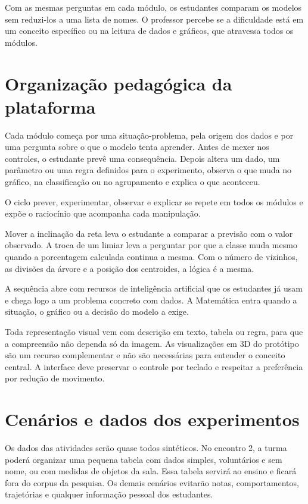 Com as mesmas perguntas em cada módulo, os estudantes comparam os modelos sem reduzi-los a uma lista de nomes. O professor percebe se a dificuldade está em um conceito específico ou na leitura de dados e gráficos, que atravessa todos os módulos.

\section{Organização pedagógica da plataforma}

Cada módulo começa por uma situação-problema, pela origem dos dados e por uma pergunta sobre o que o modelo tenta aprender. Antes de mexer nos controles, o estudante prevê uma consequência. Depois altera um dado, um parâmetro ou uma regra definidos para o experimento, observa o que muda no gráfico, na classificação ou no agrupamento e explica o que aconteceu.

O ciclo prever, experimentar, observar e explicar se repete em todos os módulos e expõe o raciocínio que acompanha cada manipulação.

Mover a inclinação da reta leva o estudante a comparar a previsão com o valor observado. A troca de um limiar leva a perguntar por que a classe muda mesmo quando a porcentagem calculada continua a mesma. Com o número de vizinhos, as divisões da árvore e a posição dos centroides, a lógica é a mesma.

A sequência abre com recursos de inteligência artificial que os estudantes já usam e chega logo a um problema concreto com dados. A Matemática entra quando a situação, o gráfico ou a decisão do modelo a exige.

Toda representação visual vem com descrição em texto, tabela ou regra, para que a compreensão não dependa só da imagem. As visualizações em 3D do protótipo são um recurso complementar e não são necessárias para entender o conceito central. A interface deve preservar o controle por teclado e respeitar a preferência por redução de movimento.

\section{Cenários e dados dos experimentos}

Os dados das atividades serão quase todos sintéticos. No encontro 2, a turma poderá organizar uma pequena tabela com dados simples, voluntários e sem nome, ou com medidas de objetos da sala. Essa tabela servirá ao ensino e ficará fora do corpus da pesquisa. Os demais cenários evitarão notas, comportamentos, trajetórias e qualquer informação pessoal dos estudantes.

